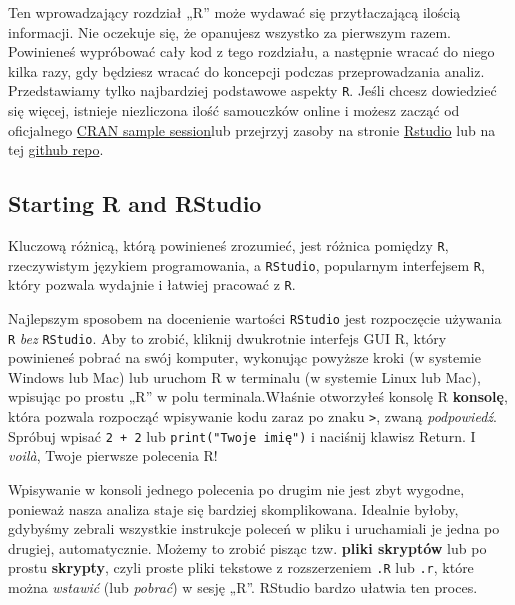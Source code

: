 \documentclass[
]{article}
\begin{document}
Ten wprowadzający rozdział „R'' może wydawać się przytłaczającą ilością
informacji. Nie oczekuje się, że opanujesz wszystko za pierwszym razem.
Powinieneś wypróbować cały kod z tego rozdziału, a następnie wracać do
niego kilka razy, gdy będziesz wracać do koncepcji podczas
przeprowadzania analiz. Przedstawiamy tylko najbardziej podstawowe
aspekty \texttt{R}. Jeśli chcesz dowiedzieć się więcej, istnieje
niezliczona ilość samouczków online i możesz zacząć od oficjalnego
\href{https://cran.r-project.org/doc/manuals/r-release/R-intro.html\#A-sample-session}{CRAN
sample session}lub przejrzyj zasoby na stronie
\href{https://www.rstudio.com/online-learning/\#DataScience}{Rstudio}
lub na tej \href{https://github.com/qinwf/awesome-R}{github repo}.

\hypertarget{starting-r-and-rstudio}{%
\subsection{Starting R and RStudio}\label{starting-r-and-rstudio}}

Kluczową różnicą, którą powinieneś zrozumieć, jest różnica pomiędzy
\texttt{R}, rzeczywistym językiem programowania, a \texttt{RStudio},
popularnym interfejsem \texttt{R}, który pozwala wydajnie i łatwiej
pracować z \texttt{R}.

Najlepszym sposobem na docenienie wartości \texttt{RStudio} jest
rozpoczęcie używania \texttt{R} \emph{bez} \texttt{RStudio}. Aby to
zrobić, kliknij dwukrotnie interfejs GUI R, który powinieneś pobrać na
swój komputer, wykonując powyższe kroki (w systemie Windows lub Mac) lub
uruchom R w terminalu (w systemie Linux lub Mac), wpisując po prostu
„R'' w polu terminala.Właśnie otworzyłeś konsolę R \textbf{konsolę},
która pozwala rozpocząć wpisywanie kodu zaraz po znaku
\texttt{\textgreater{}}, zwaną \emph{podpowiedź}. Spróbuj wpisać
\texttt{2\ +\ 2} lub \texttt{print("Twoje\ imię")} i naciśnij klawisz
Return. I \emph{voilà}, Twoje pierwsze polecenia R!

Wpisywanie w konsoli jednego polecenia po drugim nie jest zbyt wygodne,
ponieważ nasza analiza staje się bardziej skomplikowana. Idealnie
byłoby, gdybyśmy zebrali wszystkie instrukcje poleceń w pliku i
uruchamiali je jedna po drugiej, automatycznie. Możemy to zrobić pisząc
tzw. \textbf{pliki skryptów} lub po prostu \textbf{skrypty}, czyli
proste pliki tekstowe z rozszerzeniem \texttt{.R} lub \texttt{.r}, które
można \emph{wstawić} (lub \emph{pobrać}) w sesję „R''. RStudio bardzo
ułatwia ten proces.
\end{document}
